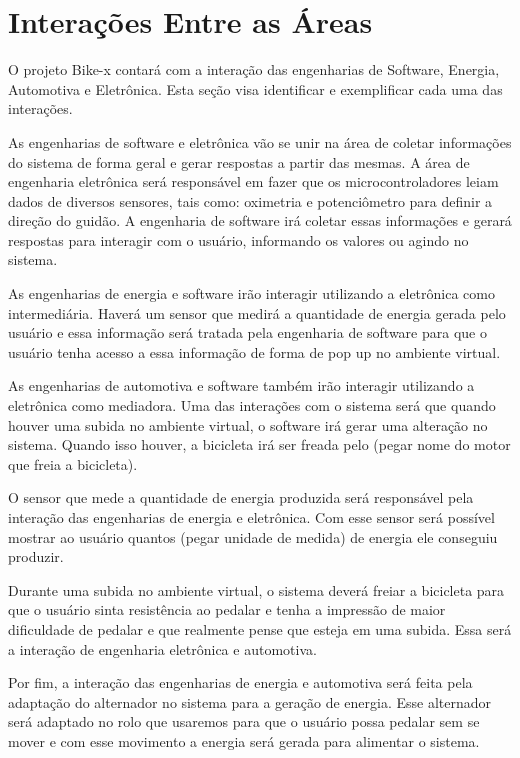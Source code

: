 \chapter*[Interações]{Interações Entre as Áreas}

O projeto Bike-x contará com a interação das engenharias de Software, Energia, Automotiva e Eletrônica. Esta seção visa identificar e exemplificar cada uma das interações. 

As engenharias de software e eletrônica vão se unir na área de coletar informações do sistema de forma geral e gerar respostas a partir das mesmas. A área de engenharia eletrônica será responsável em fazer que os microcontroladores leiam dados de diversos sensores, tais como: oximetria e potenciômetro para definir a direção do guidão.  A engenharia de software irá coletar essas informações e gerará respostas para interagir com o usuário, informando os valores ou agindo no sistema.

As engenharias de energia e software irão interagir utilizando a eletrônica como intermediária. Haverá um sensor que medirá a quantidade de energia gerada pelo usuário e essa informação será tratada pela engenharia de software para que o usuário tenha acesso a essa informação de forma de pop up no ambiente virtual.

As engenharias de automotiva e software também irão interagir utilizando a eletrônica como mediadora. Uma das interações com o sistema será que quando houver uma subida no ambiente virtual, o software irá gerar uma alteração no sistema. Quando isso houver, a bicicleta irá ser freada pelo (pegar nome do motor que freia a bicicleta).

O sensor que mede a quantidade de energia produzida será responsável pela interação das engenharias de energia e eletrônica. Com esse sensor será possível mostrar ao usuário quantos (pegar unidade de medida) de energia ele conseguiu produzir. 

Durante uma subida no ambiente virtual, o sistema deverá freiar a bicicleta para que o usuário sinta resistência ao pedalar e tenha a impressão de maior dificuldade de pedalar e que realmente pense que esteja em uma subida. Essa será a interação de engenharia eletrônica e automotiva.

Por fim, a interação das engenharias de energia e automotiva será feita pela adaptação do alternador no sistema para a geração de energia. Esse alternador será adaptado no rolo que usaremos para que o usuário possa pedalar sem se mover e com esse movimento a energia será gerada para alimentar o sistema.


